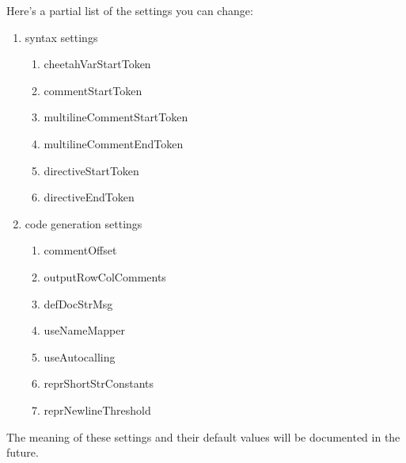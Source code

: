 Here's a partial list of the settings you can change:
\begin{enumerate}
\item syntax settings
     \begin{enumerate}
     \item cheetahVarStartToken
     \item commentStartToken
     \item multilineCommentStartToken
     \item multilineCommentEndToken
     \item directiveStartToken
     \item directiveEndToken
     \end{enumerate}
\item code generation settings
     \begin{enumerate}
     \item commentOffset
     \item outputRowColComments
     \item defDocStrMsg
     \item useNameMapper
     \item useAutocalling
     \item reprShortStrConstants
     \item reprNewlineThreshold
     \end{enumerate}
\end{enumerate}
The meaning of these settings and their default values will be documented in
the future.






